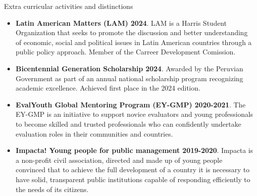\documentclass{resume} %
\begin{document}
\begin{rSection}{Extra curricular activities and distinctions}
    \begin{itemize}
        \item \textbf{Latin American Matters (LAM) 2024}. LAM is a Harris Student Organization that seeks to promote the discussion and better understanding of economic, social and political issues in Latin American countries through a public policy approach. Member of the Carreer Development Comission.
        \item \textbf{Bicentennial Generation Scholarship 2024}. Awarded by the Peruvian Government as part of an annual national scholarship program recognizing academic excellence. Achieved first place in the 2024 edition.
        \item \textbf{EvalYouth Global Mentoring Program (EY-GMP) 2020-2021}. The EY-GMP is an initiative to support novice evaluators and young professionals to become skilled and trusted professionals who can confidently undertake evaluation roles in their communities and countries. 
        \item \textbf{Impacta! Young people for public management 2019-2020}. Impacta is a non-profit civil association, directed and made up of young people convinced that to achieve the full development of a country it is necessary to have solid, transparent public institutions capable of responding efficiently to the needs of its citizens.
    \end{itemize}
\end{rSection}
\end{document}
